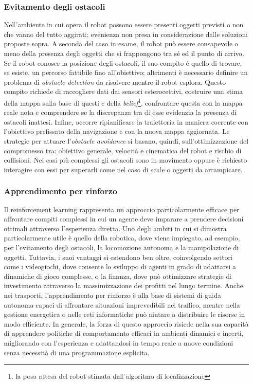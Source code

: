 \subsubsection{Evitamento degli ostacoli}
Nell'ambiente in cui opera il robot possono essere presenti oggetti previsti o non che vanno del tutto aggirati; evenienza non presa in considerazione dalle soluzioni proposte sopra. A seconda del caso in esame, il robot può essere consapevole o meno della presenza degli oggetti che si frappongono tra sé ed il punto di arrivo. Se il robot conosce la posizione degli ostacoli, il suo compito è quello di trovare, se esiste, un percorso fattibile fino all'obiettivo; altrimenti è necessario definire un problema di \textit{obstacle detection} da risolvere mentre il robot esplora. Questo compito richiede di raccogliere dati dai sensori esterocettivi, costruire una stima della mappa sulla base di questi e della \textit{belief}\footnote{la posa attesa del robot stimata dall'algoritmo di localizzazione}, confrontare questa con la mappa reale nota e comprendere se la discrepanza tra di esse evidenzia la presenza di ostacoli inattesi. Infine, occorre ripianificare la traiettoria in maniera coerente con l'obiettivo prefissato della navigazione e con la nuova mappa aggiornata. Le strategie per attuare l'\textit{obstacle avoidance} si basano, quindi, sull'ottimizzazione del compromesso tra: obiettivo generale, velocità e cinematica del robot e rischio di collisioni. Nei casi più complessi gli ostacoli sono in movimento oppure è richiesto interagire con essi per superarli come nel caso di scale o oggetti da arrampicare.


\subsubsection{Apprendimento per rinforzo}
Il reinforcement learning rappresenta un approccio particolarmente efficace per affrontare compiti complessi in cui un agente deve imparare a prendere decisioni ottimali attraverso l’esperienza diretta. Uno degli ambiti in cui si dimostra particolarmente utile è quello della robotica, dove viene impiegato, ad esempio, per l’evitamento degli ostacoli, la locomozione autonoma e la manipolazione di oggetti. Tuttavia, i suoi vantaggi si estendono ben oltre, coinvolgendo settori come i videogiochi, dove consente lo sviluppo di agenti in grado di adattarsi a dinamiche di gioco complesse, o la finanza, dove può ottimizzare strategie di investimento attraverso la massimizzazione dei profitti nel lungo termine. Anche nei trasporti, l'apprendimento per rinforzo è alla base di sistemi di guida autonoma capaci di affrontare situazioni imprevedibili nel traffico, mentre nella gestione energetica o nelle reti informatiche può aiutare a distribuire le risorse in modo efficiente. In generale, la forza di questo approccio risiede nella sua capacità di apprendere politiche di comportamento efficaci in ambienti dinamici e incerti, migliorando con l’esperienza e adattandosi in tempo reale a nuove condizioni senza necessità di una programmazione esplicita.


